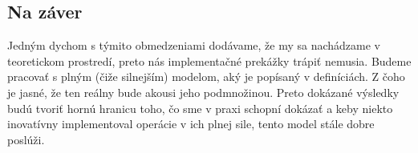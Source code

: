 \subsection*{Na záver}
\label{praxzaver}

Jedným dychom s týmito obmedzeniami dodávame, že my sa nachádzame v teo\-re\-tic\-kom prostredí, preto nás implementačné prekážky trápiť nemusia. Budeme pracovať s plným (čiže silnejším) modelom, aký je popísaný v definíciách. Z čoho je jasné, že ten reálny bude akousi jeho pod\-mno\-ži\-nou. Preto dokázané výsledky budú tvoriť hornú hranicu toho, čo sme v praxi schopní dokázať a keby niekto inovatívny implementoval operácie v ich plnej sile, tento model stále dobre poslúži.